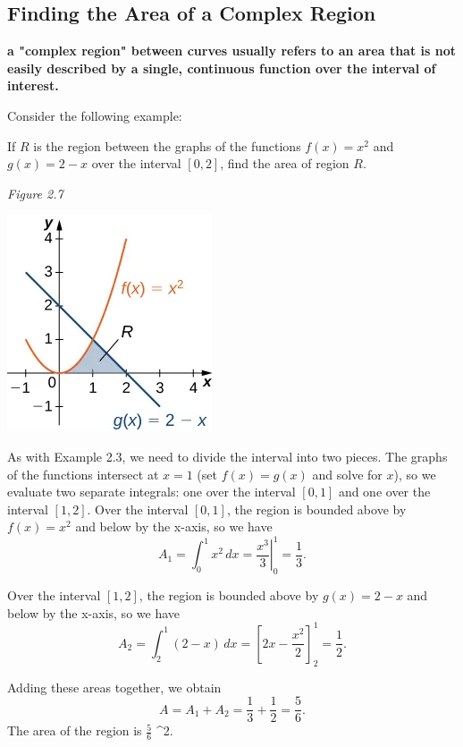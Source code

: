 \documentclass{report}
\begin{document}
    \subsection*{Finding the Area of a Complex Region}
    \bigbreak \noindent 
    \begin{definition}
    \textbf{a "complex region" between curves usually refers to an area that is not easily described by a single, continuous function over the interval of interest.} 
    \end{definition}
    \bigbreak \noindent 
    Consider the following example:
    \bigbreak \noindent 
    \begin{eg}
        If \( R \) is the region between the graphs of the functions \( f(x) = x^{2} \) and \( g(x) = 2-x \) over the interval \([0, 2]\), find the area of region \( R \).
    \end{eg}
    \bigbreak \noindent 
    \begin{minipage}{0.47\textwidth}
        \bigbreak \noindent 
        \textit{Figure 2.7}
        \begin{center}
            \includegraphics[scale=0.7]{ ./figures/graph4.png }
        \end{center}
    \end{minipage}
    \begin{minipage}{0.47\textwidth}
        As with Example 2.3, we need to divide the interval into two pieces. The graphs of the functions intersect at \( x=1 \) (set \( f(x)=g(x) \) and solve for \( x \)), so we evaluate two separate integrals: one over the interval \([0,1]\) and one over the interval \([1,2]\).
        \bigbreak \noindent 
        Over the interval \([0,1]\), the region is bounded above by \( f(x)=x^2 \) and below by the x-axis, so we have
        \[
        A_1 = \int_{0}^{1} x^2 \, dx = \left. \frac{x^3}{3} \right|_{0}^{1} = \frac{1}{3}.
        \]

        Over the interval \([1,2]\), the region is bounded above by \( g(x)=2-x \) and below by the x-axis, so we have
        \[
        A_2 = \int_{2}^{1} (2-x) \, dx = \left[ 2x - \frac{x^2}{2} \right]_{2}^{1} = \frac{1}{2}.
        \]

        Adding these areas together, we obtain
        \[
        A = A_1 + A_2 = \frac{1}{3} + \frac{1}{2} = \frac{5}{6}.
        \]
        The area of the region is \( \frac{5}{6} \) ^2.
    \end{minipage}
\end{document}
